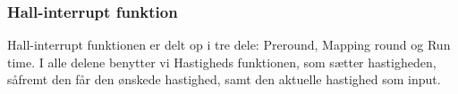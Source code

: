 \subsubsection{Hall-interrupt funktion}

Hall-interrupt funktionen er delt op i tre dele: Preround, Mapping round og Run time. I alle delene benytter vi Hastigheds funktionen, som sætter hastigheden, såfremt den får den ønskede hastighed, samt den aktuelle hastighed som input.

